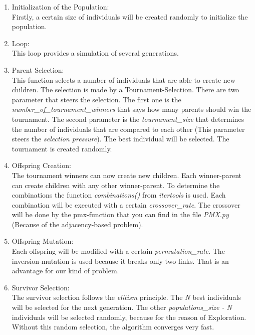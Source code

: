 \documentclass[10pt,a4paper]{article}
\begin{document}
	\begin{enumerate}
	\item Initialization of the Population:	\\
	Firstly, a certain size of individuals will be created randomly to initialize the population.
	
		
	\item Loop: \\
	This loop provides a simulation of several generations.
	
	\item Parent Selection: \\
	This function selects a number of individuals that are able to create new children. The selection is made by a Tournament-Selection. There are two parameter that steers the selection. The first one is the \textit{number\_of\_tournament\_winners} that says how many parents should win the tournament. The second parameter is the \textit{tournament\_size} that determines the number of individuals that are compared to each other (This parameter steers the \textit{selection pressure}). The best individual will be selected. The tournament is created randomly.
	
	\item Offspring Creation: \\
	The tournament winners can now create new children. Each winner-parent can create children with any other winner-parent. To determine the combinations the function  \textit{combinations()} from  \textit{itertools} is used. Each combination will be executed with a certain \textit{crossover\_rate}. The crossover will be done by the pmx-function that you can find in the file \textit{PMX.py} (Because of the adjacency-based problem).
	
	\item Offspring Mutation: \\
	Each offspring will be modified with a certain \textit{permutation\_rate}. The inversion-mutation is used because it breaks only two links. That is an advantage for our kind of problem. 
	
	\item Survivor Selection: \\
	The survivor selection follows the \textit{elitism} principle. The \textit{N} best individuals will be selected for the next generation. The other \textit{populations\_size - N} individuals will be selected randomly, because for the reason of Exploration. Without this random selection, the algorithm converges very fast.
	\end{enumerate}	
	
\end{document}
